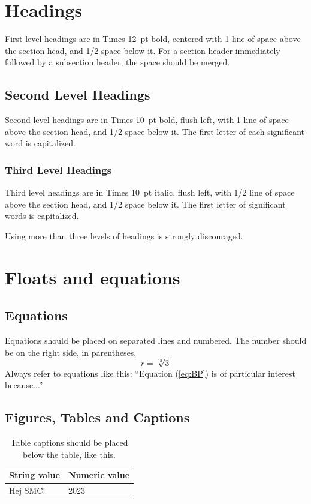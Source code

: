 \documentclass{article}
\begin{document}
\section{Headings}
First level headings are in Times 12~pt bold, centered with 1 line of space above the section head, and 1/2 space below it.
For a section header immediately followed by a subsection header, the space should be merged.

\subsection{Second Level Headings}
Second level headings are in Times 10~pt bold, flush left, with 1 line of space above the section head, and 1/2 space below it. The first letter of each significant word is capitalized.

\subsubsection{Third Level Headings}
Third level headings are in Times 10~pt italic, flush left, with 1/2 line of space above the section head, and 1/2 space below it. The first letter of significant words is capitalized.

Using more than three levels of headings is strongly discouraged.





\section{Floats and equations}

\subsection{Equations}
Equations should be placed on separated lines and numbered. The number should be on the right side, in parentheses.
\begin{equation}
r=\sqrt[13]{3}
\label{eq:BP}
\end{equation}
Always refer to equations like this: ``Equation (\ref{eq:BP}) is of particular interest because...''

\subsection{Figures, Tables and Captions}
\begin{table}[t]
 \begin{center}
 \begin{tabular}{|l|l|}
  \hline
  String value & Numeric value \\
  \hline
  Hej SMC! & 2023 \\
  \hline
 \end{tabular}
\end{center}
 \caption{Table captions should be placed below the table,  like this.}
 \label{tab:example}
\end{table}
\end{document}
